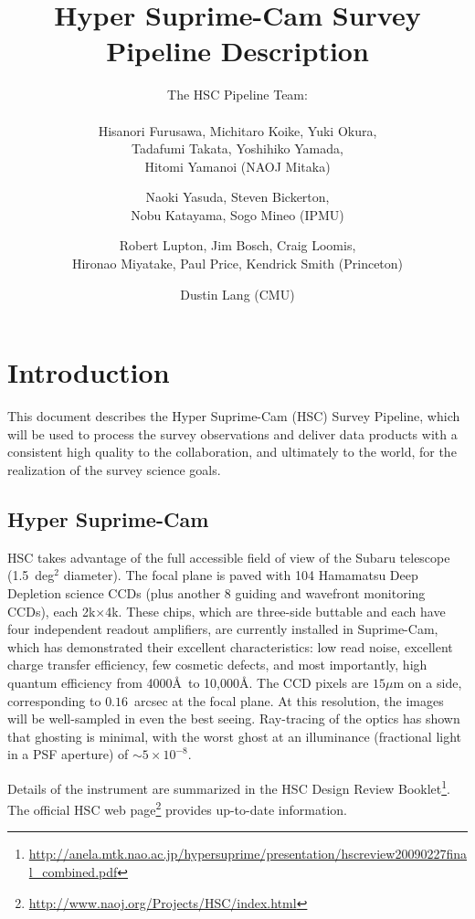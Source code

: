\documentclass[12pt]{article}
\title{Hyper Suprime-Cam Survey \\
  Pipeline Description}
\author{
  The HSC Pipeline Team: \\ \\
  Hisanori Furusawa,
  Michitaro Koike,
  Yuki Okura, \\
  Tadafumi Takata,
  Yoshihiko Yamada, \\
  Hitomi Yamanoi (NAOJ Mitaka) \and
  Naoki Yasuda,
  Steven Bickerton, \\
  Nobu Katayama,
  Sogo Mineo (IPMU) \and
  Robert Lupton,
  Jim Bosch,
  Craig Loomis, \\
  Hironao Miyatake,
  Paul Price,
  Kendrick Smith (Princeton) \and
  Dustin Lang (CMU) \\
}
\newcommand\x         {\hbox{$\times$}}
\begin{document}
\maketitle
\pagestyle{headings}

\begin{abstract}
\end{abstract}

\clearpage

\tableofcontents

\clearpage

\section{Introduction}

This document describes the Hyper Suprime-Cam (HSC) Survey Pipeline, which will be used to process the survey
observations and deliver data products with a consistent high quality to the collaboration, and ultimately to
the world, for the realization of the survey science goals.

\subsection{Hyper Suprime-Cam}


HSC takes advantage of the full accessible field of view of the Subaru telescope (1.5~deg$^2$
diameter).  The focal plane is paved with 104 Hamamatsu Deep Depletion science CCDs (plus another 8 guiding
and wavefront monitoring CCDs), each 2k\x 4k. These chips, which are three-side buttable and each have four
independent readout amplifiers, are currently installed in Suprime-Cam, which has demonstrated their excellent
characteristics: low read noise, excellent charge transfer efficiency, few cosmetic defects, and most
importantly, high quantum efficiency from 4000\AA\ to 10,000\AA.  The CCD pixels are $15\mu$m on a side,
corresponding to $0.16$~arcsec at the focal plane. At this resolution, the images will be well-sampled in even
the best seeing.  Ray-tracing of the optics has shown that ghosting is minimal, with the worst ghost at an
illuminance (fractional light in a PSF aperture) of $\sim 5 \times 10^{-8}$.

Details of the instrument are summarized in the HSC
Design Review
Booklet\footnote{\url{http://anela.mtk.nao.ac.jp/hypersuprime/presentation/hscreview20090227final_combined.pdf}}. The
official HSC
web page\footnote{\url{http://www.naoj.org/Projects/HSC/index.html}}
provides up-to-date information.
\end{document}
